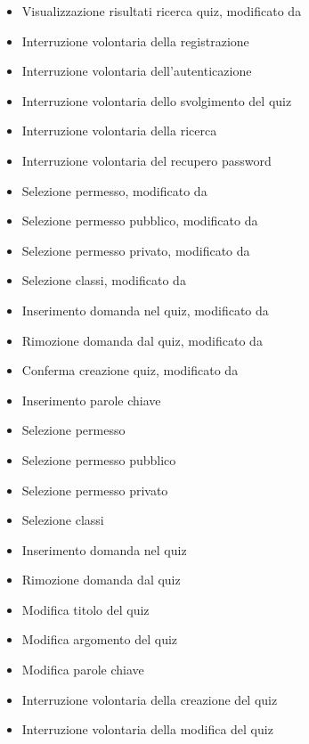 \begin{itemize}
	\item {} Visualizzazione risultati ricerca quiz, modificato da 
	\item {} Interruzione volontaria della registrazione 
	\item {} Interruzione volontaria dell'autenticazione
	\item {} Interruzione volontaria dello svolgimento del quiz
	\item {} Interruzione volontaria della ricerca
	\item {} Interruzione volontaria del recupero password
	\item {} Selezione permesso, modificato da 
	\item {} Selezione permesso pubblico, modificato da 
	\item {} Selezione permesso privato, modificato da 
	\item {} Selezione classi, modificato da 
	\item {} Inserimento domanda nel quiz, modificato da 
	\item {} Rimozione domanda dal quiz, modificato da 
	\item {} Conferma creazione quiz, modificato da 
	\item {} Inserimento parole chiave 
	\item {} Selezione permesso
	\item {} Selezione permesso pubblico
	\item {} Selezione permesso privato
	\item {} Selezione classi
	\item {} Inserimento domanda nel quiz
	\item {} Rimozione domanda dal quiz
	\item {} Modifica titolo del quiz
	\item {} Modifica argomento del quiz
	\item {} Modifica parole chiave 
	\item {} Interruzione volontaria della creazione del quiz
	\item {} Interruzione volontaria della modifica del quiz

\end{itemize}
